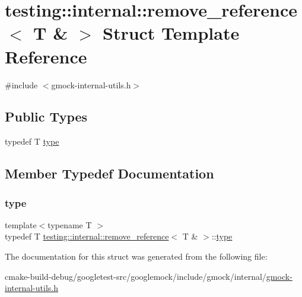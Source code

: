 \hypertarget{structtesting_1_1internal_1_1remove__reference_3_01T_01_6_01_4}{}\section{testing\+::internal\+::remove\+\_\+reference$<$ T \& $>$ Struct Template Reference}
\label{structtesting_1_1internal_1_1remove__reference_3_01T_01_6_01_4}


{\ttfamily \#include $<$gmock-\/internal-\/utils.\+h$>$}

\subsection*{Public Types}
\begin{DoxyCompactItemize}
\item 
typedef T \mbox{\hyperlink{structtesting_1_1internal_1_1remove__reference_3_01T_01_6_01_4_a0d72f004f54016a47c752a82be352a19}{type}}
\end{DoxyCompactItemize}


\subsection{Member Typedef Documentation}
\mbox{\label{structtesting_1_1internal_1_1remove__reference_3_01T_01_6_01_4_a0d72f004f54016a47c752a82be352a19}} 
\subsubsection{\texorpdfstring{type}{type}}
{\footnotesize\ttfamily template$<$typename T $>$ \\
typedef T \mbox{\hyperlink{structtesting_1_1internal_1_1remove__reference}{testing\+::internal\+::remove\+\_\+reference}}$<$ T \& $>$\+::\mbox{\hyperlink{structtesting_1_1internal_1_1remove__reference_3_01T_01_6_01_4_a0d72f004f54016a47c752a82be352a19}{type}}}



The documentation for this struct was generated from the following file\+:\begin{DoxyCompactItemize}
\item 
cmake-\/build-\/debug/googletest-\/src/googlemock/include/gmock/internal/\mbox{\hyperlink{gmock-internal-utils_8h}{gmock-\/internal-\/utils.\+h}}\end{DoxyCompactItemize}
